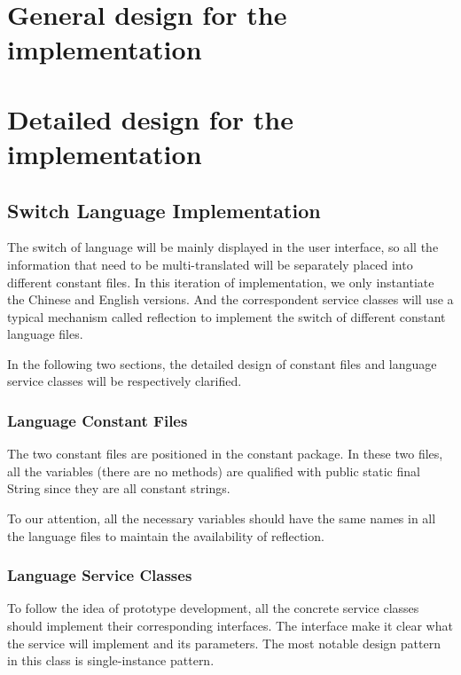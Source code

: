 \documentclass[a4paper]{report}
\begin{document}
\chapter{General design for the implementation}



\chapter{Detailed design for the implementation}

\section{Switch Language Implementation}
\par The switch of language will be mainly displayed in the user interface, so all the information that need to be multi-translated will be separately placed into  different constant files. In this iteration of implementation, we only instantiate the Chinese and English versions. And the correspondent service classes will use a typical mechanism called reflection to implement the switch of different constant language files.
\par In the following two sections, the detailed design of constant files and language service classes will be respectively clarified.
\subsection{Language Constant Files}
\par The two constant files are positioned in the constant package. In these two files, all the variables (there are no methods) are qualified with public static final String since they are all constant strings.
\par To our attention, all the necessary variables should have the same names in all the language files to maintain the availability of reflection.
\subsection{Language Service Classes }
\par To follow the idea of prototype development, all the concrete service classes should implement their corresponding interfaces. The interface make it clear what the service will implement and its parameters. The most notable design pattern in this class is single-instance pattern.
\end{document}
